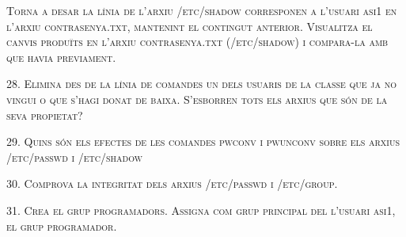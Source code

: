 \documentclass[a4paper,12pt]{article}
\begin{document}
\textsc{Torna a desar la línia de l’arxiu /etc/shadow corresponen a l’usuari asi1 en l’arxiu contrasenya.txt, mantenint el contingut anterior. Visualitza el canvis produïts en l’arxiu contrasenya.txt (/etc/shadow) i compara-la amb que havia previament.}

\textsc{28. Elimina des de la línia de comandes un dels usuaris de la classe que ja no vingui o que s’hagi donat de baixa. S’esborren tots els arxius que són de la seva propietat?}

\textsc{29. Quins són els efectes de les comandes pwconv i pwunconv sobre els arxius /etc/passwd i /etc/shadow}

\textsc{30. Comprova la integritat dels arxius /etc/passwd i /etc/group.}

\textsc{31. Crea el grup programadors. Assigna com grup principal del l’usuari asi1, el grup programador.}
\end{document}
